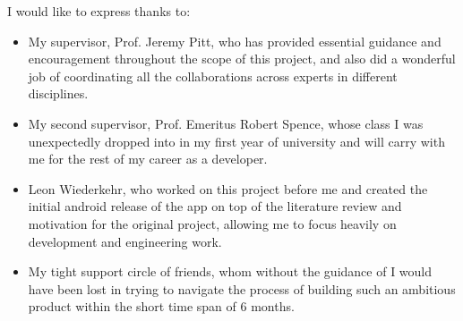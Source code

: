 \cleardoublepage

\begin{acknowledgements}

I would like to express thanks to:

\begin{itemize}
 \item My supervisor, Prof. Jeremy Pitt, who has provided essential guidance and encouragement throughout the scope of this project, and also did a wonderful job of coordinating all the collaborations across experts in different disciplines.
 \vspace*{3mm}
 \item My second supervisor, Prof. Emeritus Robert Spence, whose class I was unexpectedly dropped into in my first year of university and will carry with me for the rest of my career as a developer.
 \vspace*{3mm}
 \item Leon Wiederkehr, who worked on this project before me and created the initial android release of the app on top of the literature review and motivation for the original project, allowing me to focus heavily on development and engineering work.
 \vspace*{3mm}
 \item My tight support circle of friends, whom without the guidance of I would have been lost in trying to navigate the process of building such an ambitious product within the short time span of 6 months.
\end{itemize}

\end{acknowledgements}